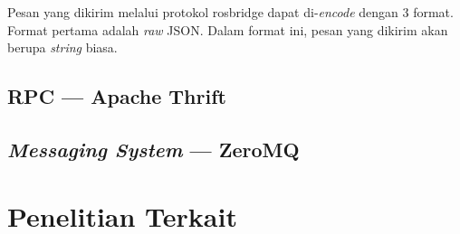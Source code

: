 Pesan yang dikirim melalui protokol rosbridge dapat di-\textit{encode} dengan 3 format.
Format pertama adalah \textit{raw} JSON.
Dalam format ini, pesan yang dikirim akan berupa \textit{string} biasa.

\subsection{RPC --- Apache Thrift}
\subsection{\textit{Messaging System} --- ZeroMQ}

\section{Penelitian Terkait}
\blindtext

